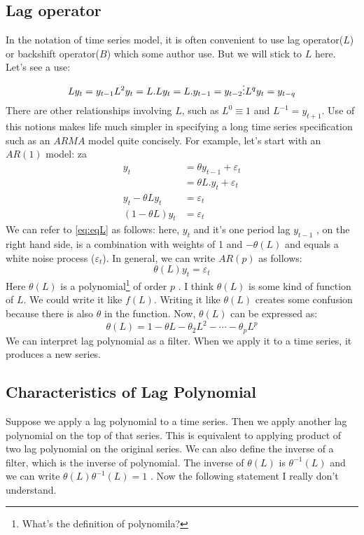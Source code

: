 \documentclass{book}
\begin{document}
\subsection{Lag operator}\label{lop}
In the notation of time series model, it is often convenient to use lag operator($L$) or backshift operator($B$) which some author use. But we will stick to $L$ here. Let's see a use:
\begin{equation}
    Ly_t=y_{t-1}\\
    L^2y_t=L.Ly_t=L.y_{t-1}=y_{t-2}\\
    \vdots \\
    L^q y_t=y_{t-q}
    \label{}
\end{equation}
There are other relationships involving $L$, such as $L^0 \equiv 1$ and $L^{-1}=y_{t+1}$. Use of this notions makes life much simpler in specifying a long time series specification such as an $ARMA$ model quite concisely. For example, let's start with an $AR(1)$ model:
za\begin{equation}
    \begin{split}
        y_t & =\theta y_{t-1}+\varepsilon_t \\
            & =\theta L.y_t+\varepsilon_t \\
            y_t-\theta Ly_t & = \varepsilon_t \\
            (1-\theta L)y_t &= \varepsilon_t
    \end{split}
    \label{eq:eqL}
\end{equation}
We can refer to \ref{eq:eqL} as follows: here, $y_t$ and it's one period lag $y_{t-1}$ , on the right hand side, is a combination with weights of 1 and $-\theta(L)$ and equals a white noise process ($\varepsilon_t$). In general, we can write $AR(p)$ as follows:
\begin{equation}
    \theta(L)y_t=\varepsilon_t
    \label{eq:eqargen}
\end{equation}
Here $\theta(L)$ is a polynomial\footnote{What's the definition of polynomila?} of order $p$ . I think $\theta(L)$ is some kind of function of $L$. We could write it like $f(L)$. Writing it like $\theta(L)$ creates some confusion because there is also $\theta$ in the function. Now, $\theta(L)$ can be expressed as: 
\begin{equation}
    \theta(L)=1-\theta L -\theta_2 L^2-\dotsb-\theta_p L^p
    \label{eqlagpol}
\end{equation}
We can interpret lag polynomial as a filter. When we apply it to a time series, it produces a new series. 
\subsection{Characteristics of Lag Polynomial}
Suppose we apply a lag polynomial to a time series. Then we apply another lag polynomial on the top of that series. This is equivalent to applying product of two lag polynomial on the original series. We can also define the inverse of a filter, which is the inverse of polynomial. The inverse of $\theta(L)$ is $\theta^{-1}(L)$ and we can write $\theta(L) \theta^{-1}(L)=1$ . Now the following statement I really don't understand. 
\end{document}
